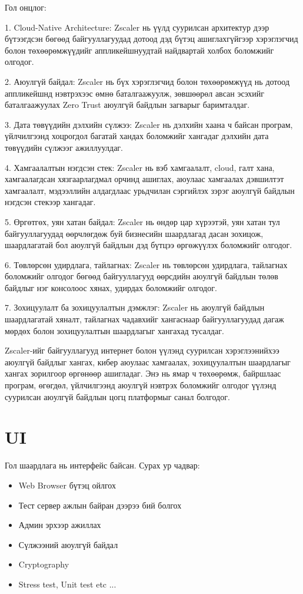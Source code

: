 					Гол онцлог:
					
					1. Cloud-Native Architecture: Zscaler нь үүлд суурилсан архитектур дээр бүтээгдсэн бөгөөд байгууллагуудад дотоод дэд бүтэц ашиглахгүйгээр хэрэглэгчид болон төхөөрөмжүүдийг аппликейшнуудтай найдвартай холбох боломжийг олгодог.
					
					2. Аюулгүй байдал: Zscaler нь бүх хэрэглэгчид болон төхөөрөмжүүд нь дотоод аппликейшнд нэвтрэхээс өмнө баталгаажуулж, зөвшөөрөл авсан эсэхийг баталгаажуулах Zero Trust аюулгүй байдлын загварыг баримталдаг.
					
					3. Дата төвүүдийн дэлхийн сүлжээ: Zscaler нь дэлхийн хаана ч байсан програм, үйлчилгээнд хоцрогдол багатай хандах боломжийг хангадаг дэлхийн дата төвүүдийн сүлжээг ажиллуулдаг.
					
					4. Хамгаалалтын нэгдсэн стек: Zscaler нь вэб хамгаалалт, cloud, галт хана, хамгаалагдсан хязгаарлагдмал орчинд ашиглах, аюулаас хамгаалах дэвшилтэт хамгаалалт, мэдээллийн алдагдлаас урьдчилан сэргийлэх зэрэг аюулгүй байдлын нэгдсэн стекээр хангадаг.
					
					5. Өргөтгөх, уян хатан байдал: Zscaler нь өндөр цар хүрээтэй, уян хатан тул байгууллагуудад өөрчлөгдөж буй бизнесийн шаардлагад дасан зохицож, шаардлагатай бол аюулгүй байдлын дэд бүтцээ өргөжүүлэх боломжийг олгодог.
					
					6. Төвлөрсөн удирдлага, тайлагнах: Zscaler нь төвлөрсөн удирдлага, тайлагнах боломжийг олгодог бөгөөд байгууллагууд өөрсдийн аюулгүй байдлын төлөв байдлыг нэг консолоос хянах, удирдах боломжийг олгодог.
					
					7. Зохицуулалт ба зохицуулалтын дэмжлэг: Zscaler нь аюулгүй байдлын шаардлагатай хяналт, тайлагнах чадавхийг хангаснаар байгууллагуудад дагаж мөрдөх болон зохицуулалтын шаардлагыг хангахад тусалдаг.
					
					Zscaler-ийг байгууллагууд интернет болон үүлэнд суурилсан хэрэглээнийхээ аюулгүй байдлыг хангах, кибер аюулаас хамгаалах, зохицуулалтын шаардлагыг хангах зорилгоор өргөнөөр ашигладаг. Энэ нь ямар ч төхөөрөмж, байршлаас програм, өгөгдөл, үйлчилгээнд аюулгүй нэвтрэх боломжийг олгодог үүлэнд суурилсан аюулгүй байдлын цогц платформыг санал болгодог. 
	\pagebreak
			
\section{UI}
Гол шаардлага нь интерфейс байсан.
Сурах ур чадвар: 
\begin{itemize}
    \item Web Browser бүтэц ойлгох
    \item Тест сервер ажлын байран дээрээ бий болгох
    \item Админ эрхээр ажиллах
    \item Сүлжээний аюулгүй байдал
    \item Cryptography
    \item Stress test, Unit test etc ...
\end{itemize}

